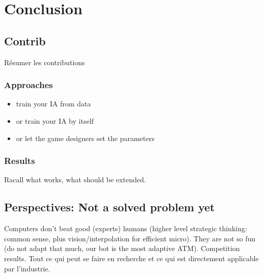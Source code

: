 \chapter{Conclusion}

\section{Contrib}
Résumer les contributions
\subsection{Approaches}
\begin{itemize}
\item train your IA from data
\item or train your IA by itself
\item or let the game designers set the parameters
\end{itemize}

\subsection{Results}
Racall what works, what should be extended.

\section{Perspectives: Not a solved problem yet}
Computers don't beat good (experts) humans (higher level strategic thinking: common sense, plus vision/interpolation for efficient micro). They are not so fun (do not adapt that much, our bot is the most adaptive ATM). Competition results.
Tout ce qui peut se faire en recherche et ce qui est directement applicable par l'industrie.


